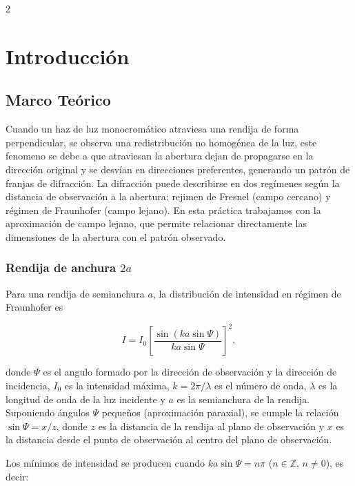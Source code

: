 \documentclass[12pt,a4paper]{article}
\begin{document}
\begin{multicols}{2}

\section{Introducción}

\subsection{Marco Teórico}

Cuando un haz de luz monocromático atraviesa una rendija de forma perpendicular, se observa una redistribución no homogénea de la luz, este fenomeno se debe a que atraviesan la abertura dejan de propagarse en la dirección original y se desvían en direcciones preferentes, generando un patrón de franjas de difracción.
\bigskip
La difracción puede describirse en dos regímenes según la distancia de observación a la abertura: rejimen de Fresnel (campo cercano) y régimen de Fraunhofer (campo lejano). En esta práctica trabajamos con la aproximación de campo lejano, que permite relacionar directamente las dimensiones de la abertura con el patrón observado.

\subsubsection{\texorpdfstring{Rendija de anchura $2a$}{Rendija de anchura 2a}}

Para una rendija de semianchura $a$, la distribución de intensidad en régimen de Fraunhofer es

\begin{equation}
  I = I_0 \left[\frac{\sin(ka\sin\Psi)}{ka\sin\Psi}\right]^2,
  \label{eq:rendija}
\end{equation}

donde $\Psi$ es el angulo formado por la dirección de observación y la dirección de incidencia,
$I_0$ es la intensidad máxima, $k = 2\pi/\lambda$ es el número de onda, $\lambda$ es la longitud
de onda de la luz incidente y $a$ es la semianchura de la rendija. Suponiendo ángulos $\Psi$
pequeños (aproximación paraxial), se cumple la relación $\sin\Psi = x/z$, donde $z$ es la
distancia de la rendija al plano de observación y $x$ es la distancia desde el punto de
observación al centro del plano de observación.

\bigskip
Los mínimos de intensidad se producen cuando $ka\sin\Psi = n\pi$ ($n \in \mathbb{Z},\, n\neq 0$), es decir:


\end{multicols}
\end{document}
